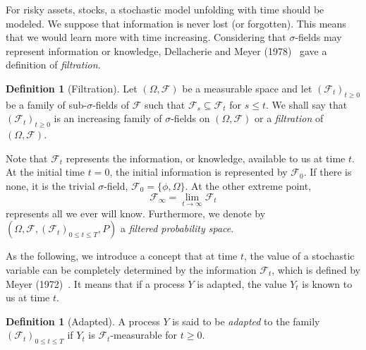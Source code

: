 \documentclass[a4paper]{article}
\theoremstyle{definition}
\newtheorem{definition}[theorem]{Definition}
\numberwithin{equation}{section}
\begin{document}
For risky assets, stocks, a stochastic model unfolding with time should be modeled. We suppose that information is never lost (or forgotten). This means that we would learn more with time increasing. Considering that $\sigma$-fields may represent information or knowledge, Dellacherie and Meyer (1978)~\cite{def_filtration} gave a definition of \emph{filtration}.
\begin{definition}[Filtration]
Let $(\Omega,\mathcal F)$ be a measurable space and let $(\mathcal F_t)_{t\geq0}$ be a family of sub-$\sigma$-fields of $\mathcal F$ such that $\mathcal F_s\subseteq\mathcal F_t$ for $s\leq t$. We shall say that $(\mathcal F_t)_{t\geq0}$ is an increasing family of $\sigma$-fields on $(\Omega,\mathcal F)$ or a \emph{filtration} of $(\Omega,\mathcal F)$.
\end{definition}
Note that $\mathcal F_t$ represents the information, or knowledge, available to us at time $t$. At the initial time $t=0$, the initial information is represented by $\mathcal F_0$. If there is none, it is the trivial $\sigma$-field, $\mathcal F_0=\{\phi,\Omega\}$. At the other extreme point,
$$\mathcal F_\infty=\lim_{t\rightarrow\infty}\mathcal F_t$$
represents all we ever will know. Furthermore, we denote by $(\Omega,\mathcal F,(\mathcal F_t)_{0\leq t\leq T},P)$ a \emph{filtered probability space}.

As the following, we introduce a concept that at time $t$, the value of a stochastic variable can be completely determined by the information $\mathcal F_t$, which is defined by Meyer (1972)~\cite{def_adapted}. It means that if a process $Y$ is adapted, the value $Y_t$ is known to us at time $t$.
\begin{definition}[Adapted]
A process $Y$ is said to be \emph{adapted} to the family $(\mathcal F_t)_{0\leq t\leq T}$ if $Y_t$ is $\mathcal F_t$-measurable for $t\geq0$.
\end{definition}
\end{document}
